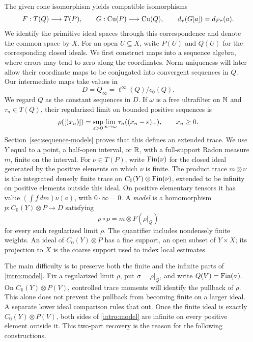 The given cone isomorphism yields compatible isomorphisms
\[
 F:T(Q)\longrightarrow T(P),\qquad
 G:\operatorname{Cu}(P)\longrightarrow\operatorname{Cu}(Q),
 \qquad
 d_\tau(G[a])=d_{F\tau}(a).
\]
We identify the primitive ideal spaces through this correspondence
and denote the common space by \(X\). For an open $U\subseteq X$,
write $P(U)$ and $Q(U)$ for the corresponding closed ideals.
We first construct maps into a sequence algebra, where errors may tend
to zero along the coordinates. Norm uniqueness will later allow their
coordinate maps to be conjugated into convergent sequences in $Q$.
Our intermediate maps take values in
\[
 D=Q_\infty=\ell^\infty(Q)/c_0(Q).
\]
We regard $Q$ as the constant sequences in $D$. If $\omega$ is a free
ultrafilter on $\mathbb N$ and $\tau_n\in T(Q)$, their regularized limit on
bounded positive sequences is
\[
 \rho([(x_n)])=\sup_{\varepsilon>0}\lim_{n\to\omega}
                    \tau_n((x_n-\varepsilon)_+),\qquad x_n\geq0.
\]
Section~\ref{sec:sequence-models} proves that this defines an extended
trace. We use $Y$ equal to a point, a half-open interval, or $\mathbb R$,
with a full-support Radon measure $m$, finite on the interval.
For $\nu\in T(P)$, write $\operatorname{Fin}(\nu)$ for the closed ideal generated by the positive
elements on which $\nu$ is finite. The product trace $m\otimes\nu$
is the integrated densely finite trace on $C_0(Y)\otimes\operatorname{Fin}(\nu)$,
extended to be infinity on positive elements outside this ideal.
On positive elementary tensors it has value $(\int f\,dm)\nu(a)$,
with $0\cdot\infty=0$.
A \emph{model} is a homomorphism
\(p:C_0(Y)\otimes P\to D\) satisfying
\begin{equation}\label{intro:model}
 \rho\circ p=m\otimes F(\rho|_Q)
\end{equation}
for every such regularized limit \(\rho\). The quantifier includes
nondensely finite weights. An ideal of $C_0(Y)\otimes P$ has a fine
support, an open subset of $Y\times X$; its projection to $X$ is the
coarse support used to index local estimates.

The main difficulty is to preserve both the finite and the infinite
parts of \eqref{intro:model}. Fix a regularized limit $\rho$, put
$\sigma=\rho|_Q$, and write $Q(V)=\operatorname{Fin}(\sigma)$. On
$C_0(Y)\otimes P(V)$, controlled trace moments will identify the
pullback of $\rho$. This alone does not prevent the pullback from
becoming finite on a larger ideal. A separate lower ideal comparison
rules that out. Once the finite ideal is exactly
$C_0(Y)\otimes P(V)$, both sides of \eqref{intro:model} are infinite
on every positive element outside it. This two-part recovery is the
reason for the following constructions.

